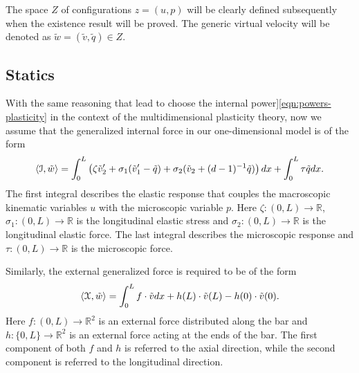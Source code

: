 \documentclass[a4paper,10pt,oneside]{amsbook}
\numberwithin{section}{chapter}
\numberwithin{equation}{chapter}
\theoremstyle{definition}
\DeclarePairedDelimiter{\dual}{\langle}{\rangle}
\begin{document}
The space $Z$ of configurations $z=(u,p)$ will be clearly defined subsequently when the existence result will be proved. The generic virtual velocity will be denoted as $\tilde w=(\tilde v,\tilde q)\in Z$.

\subsection{Statics}

With the same reasoning that lead to choose the internal power]\eqref{eqn:powers-plasticity} in the context of the multidimensional plasticity theory, now we assume that the generalized internal force in our one-dimensional model is of the form
\[
\dual{\mathcal I,\tilde w}=\int_0^L\left(\zeta\tilde v_2'+\sigma_1(\tilde v_1'-\tilde q)+\sigma_2(\tilde v_2+(d-1)^{-1}\tilde q)\right)dx+\int_0^L\tau\tilde qdx.
\]
The first integral describes the elastic response that couples the macroscopic kinematic variables $u$ with the microscopic variable $p$. Here $\zeta\colon(0,L)\to\mathbb{R}$, $\sigma_1\colon(0,L)\to\mathbb{R}$ is the longitudinal elastic stress and $\sigma_2\colon(0,L)\to\mathbb{R}$ is the longitudinal elastic force. The last integral describes the microscopic response and $\tau\colon(0,L)\to\mathbb{R}$ is the microscopic force.

Similarly, the external generalized force is required to be of the form
\[
\dual{\mathcal X,\tilde w}=\int_0^Lf\cdot\tilde vdx+h(L)\cdot\tilde v(L)-h(0)\cdot\tilde v(0).
\]
Here $f\colon(0,L)\to\mathbb{R}^2$ is an external force distributed along the bar and $h\colon\{0,L\}\to\mathbb{R}^2$ is an external force acting at the ends of the bar. The first component of both $f$ and $h$ is referred to the axial direction, while the second component is referred to the longitudinal direction.
\end{document}
